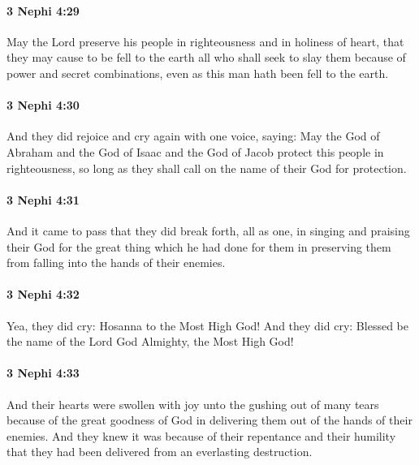 		\paragraph{3 Nephi 4:29} %
			\label{3NEPHI-4-29}

			May the Lord preserve his people in righteousness and in holiness of heart,
			that they may cause to be fell to the earth all who shall seek to slay them
			because of power and secret combinations,
			even as this man hath been fell to the earth.

		\paragraph{3 Nephi 4:30} %
			\label{3NEPHI-4-30}

			And they did rejoice and cry again with one voice, saying:
			May the God of Abraham and the God of Isaac and the God of Jacob
			protect this people in righteousness,
			so long as they shall call on the name of their God for protection.

		\paragraph{3 Nephi 4:31} %
			\label{3NEPHI-4-31}

			And it came to pass that they did break forth, all as one,
			in singing and praising their God
			for the great thing which he had done for them
			in preserving them from falling into the hands of their enemies.

		\paragraph{3 Nephi 4:32} %
			\label{3NEPHI-4-32}

			Yea, they did cry:
			Hosanna to the Most High God!
			And they did cry:
			Blessed be the name of the Lord God Almighty, the Most High God!

		\paragraph{3 Nephi 4:33} %
			\label{3NEPHI-4-33}

			And their hearts were swollen with joy
			unto the gushing out of many tears
			because of the great goodness of God
			in delivering them out of the hands of their enemies.
			And they knew it was because of their repentance and their humility
			that they had been delivered from an everlasting destruction.

